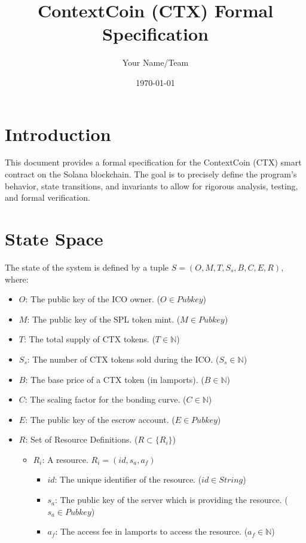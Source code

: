 \documentclass{article}
\title{ContextCoin (CTX) Formal Specification}
\author{Your Name/Team}
\date{\today}
\begin{document}
\maketitle

\section{Introduction}

This document provides a formal specification for the ContextCoin (CTX) smart contract on the Solana blockchain. The goal is to precisely define the program's behavior, state transitions, and invariants to allow for rigorous analysis, testing, and formal verification.

\section{State Space}

The state of the system is defined by a tuple $S = (O, M, T, S_s, B, C, E, R)$, where:

\begin{itemize}
    \item $O$: The public key of the ICO owner. ($O \in Pubkey$)
    \item $M$: The public key of the SPL token mint. ($M \in Pubkey$)
    \item $T$: The total supply of CTX tokens. ($T \in \mathbb{N}$)
    \item $S_s$: The number of CTX tokens sold during the ICO. ($S_s \in \mathbb{N}$)
    \item $B$: The base price of a CTX token (in lamports). ($B \in \mathbb{N}$)
    \item $C$: The scaling factor for the bonding curve. ($C \in \mathbb{N}$)
    \item $E$: The public key of the escrow account. ($E \in Pubkey$)
     \item $R$: Set of Resource Definitions. ($R \subset \{R_i\}$)
        \begin{itemize}
             \item $R_i$: A resource.  $R_i = (id, s_a, a_f)$
                 \begin{itemize}
                     \item $id$: The unique identifier of the resource. ($id \in String$)
                     \item $s_a$: The public key of the server which is providing the resource. ($s_a \in Pubkey$)
                     \item $a_f$: The access fee in lamports to access the resource. ($a_f \in \mathbb{N}$)
                 \end{itemize}
         \end{itemize}

\end{itemize}
\end{document}
